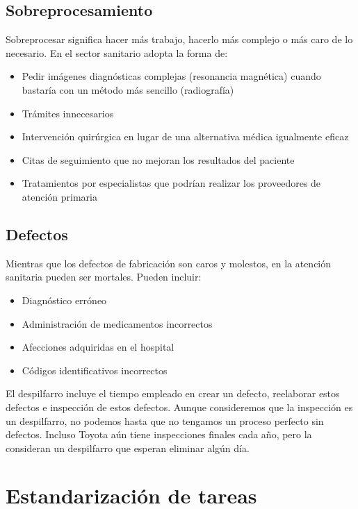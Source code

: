 \subsection{Sobreprocesamiento}

Sobreprocesar significa hacer más trabajo, hacerlo más complejo o más caro de lo necesario.
En el sector sanitario adopta la forma de:

\begin{itemize}
    \item Pedir imágenes diagnósticas complejas (resonancia magnética) cuando bastaría con un método más sencillo (radiografía)
    \item Trámites innecesarios
    \item Intervención quirúrgica en lugar de una alternativa médica igualmente eficaz
    \item Citas de seguimiento que no mejoran los resultados del paciente
    \item Tratamientos por especialistas que podrían realizar los proveedores de atención primaria
\end{itemize}

\subsection{Defectos}

Mientras que los defectos de fabricación son caros y molestos, en la atención sanitaria pueden ser mortales.
Pueden incluir:

\begin{itemize}
    \item Diagnóstico erróneo
    \item Administración de medicamentos incorrectos
    \item Afecciones adquiridas en el hospital
    \item Códigos identificativos incorrectos
\end{itemize}

El despilfarro incluye el tiempo empleado en crear un defecto, reelaborar estos defectos e inspección de estos defectos.
Aunque consideremos que la inspección es un despilfarro, no podemos hasta que no tengamos un proceso perfecto sin defectos.
Incluso Toyota aún tiene inspecciones finales cada año, pero la consideran un despilfarro que esperan eliminar algún día.

\section{Estandarización de tareas}

